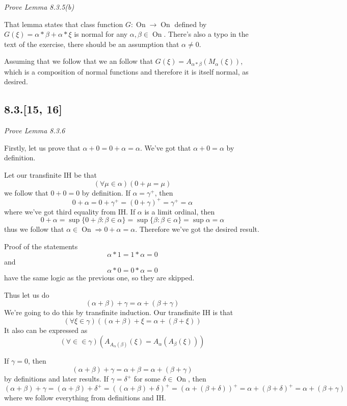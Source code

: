 \documentclass[11pt,oneside,titlepage]{book}
\DeclareMathOperator \ra {\Rightarrow}
\DeclareMathOperator \On {On}
\newcommand{\set}[1]{\{ #1 \}}
\begin{document}
\textit{Prove Lemma 8.3.5(b)}

That lemma states that class function $G: \On \to \On$ defined by
$G(\xi) = \alpha * \beta + \alpha * \xi$ is normal for any $\alpha, \beta \in \On$.
There's also a typo in the text of the exercise, there should be an assumption that
$\alpha \neq 0$.

Assuming that we follow that we an follow that $G(\xi) = A_{\alpha * \beta}(M_\alpha(\xi))$,
which is a composition of normal functions and therefore it is itself normal, as desired.

\subsection*{8.3.[15, 16]}

\textit{Prove Lemma 8.3.6}

Firstly, let us prove that
$\alpha + 0 = 0 + \alpha = \alpha$. 
We've got that $\alpha + 0 = \alpha$ by definition.

Let our transfinite IH be that
$$(\forall \mu \in \alpha)(0 + \mu = \mu )$$
we follow that $0 + 0 = 0$ by definition. If $\alpha = \gamma^+$, then
$$0 + \alpha = 0 + \gamma^+ = (0 + \gamma)^+ = \gamma^+ = \alpha$$
where we've got third equality from IH. If $\alpha$ is a limit ordinal, then
$$0 + \alpha = \sup\set{0 + \beta: \beta \in \alpha} = \sup\set{\beta : \beta \in \alpha} =
\sup \alpha = \alpha$$
thus we follow that $\alpha \in \On \ra 0 + \alpha = \alpha$. Therefore
we've got the desired result.

Proof of the  statements
$$\alpha * 1 = 1 * \alpha = 0$$
and
$$\alpha * 0 = 0 * \alpha = 0$$
have the same logic as the previous one, so they are skipped.

Thus let us do
$$(\alpha + \beta) + \gamma = \alpha + (\beta + \gamma)$$
We're going to do this by transfinite induction.
Our transfinite IH is that
$$(\forall \xi \in \gamma)((\alpha + \beta) + \xi = \alpha + (\beta + \xi))$$
It also can be expressed as
$$(\forall \in \in \gamma)(A_{A_\alpha(\beta)} (\xi) = A_\alpha (A_\beta(\xi)))$$

If $\gamma = 0$, then
$$(\alpha + \beta) + \gamma = \alpha + \beta = \alpha + (\beta + \gamma)$$
by definitions and later results.
If $\gamma = \delta^+$ for some $\delta \in \On$, then
$$(\alpha + \beta) + \gamma = (\alpha + \beta) + \delta^+ = 
((\alpha + \beta) + \delta)^+ = (\alpha + (\beta + \delta))^+ = \alpha + (\beta + \delta)^+ =
\alpha + (\beta + \gamma)$$
where we follow everything from definitions and IH.
\end{document}
